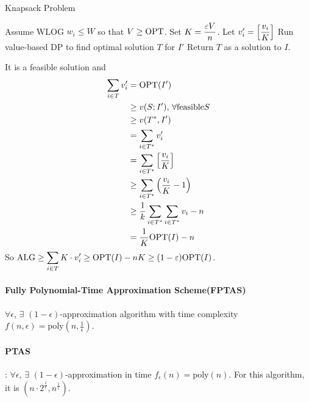 \begin{example}
    \begin{algorithm}
        \caption{Knapsack Problem}
        \begin{algorithmic}[1]
            \STATE Assume WLOG  $ w_i \leq W $ so that  $ V \geq \mathrm{OPT} $.
            \STATE Set  $ K=\displaystyle\frac{\varepsilon V}{n} $. Let  $ v_i'=\left[\displaystyle\frac{v_i}{K}\right] $
            \STATE Run value-based DP to find optimal solution  $ T $ for  $ I' $ 
            \STATE Return  $ T $ as a solution to  $ I $.       
        \end{algorithmic}
    \end{algorithm}
    It is a feasible solution and 
    \begin{align*}
        \sum_{i\in T}v_i'&=\mathrm{OPT}(I')\\
        & \geq v(S;I'),\,\forall \text{feasible} S\\
        & \geq v(T^*,I')\\
        &=\sum_{i\in T^*}v_i'\\
        &=\sum_{i\in T^*}\left[\frac{v_i}{K}\right]\\
        & \geq \sum_{i\in T^*}\left(\frac{v_i}{K}-1\right)\\
        & \geq \frac{1}{k}\sum_{i\in T^*}\sum_{i\in T^*}v_i-n\\
        &=\frac{1}{K}\mathrm{OPT}(I)-n
    \end{align*}
    So  $ \mathrm{ALG} \geq \displaystyle\sum_{i\in T}K\cdot v_i' \geq \mathrm{OPT}(I)-nK \geq (1-\varepsilon)\mathrm{OPT}(I) $. 

    \paragraph{Fully Polynomial-Time Approximation Scheme(FPTAS)}
     $ \forall \epsilon $,  $ \exists  $ $ (1-\epsilon) $-approximation algorithm with time complexity  $ f(n,\epsilon)=\mathrm{poly}(n,\frac{1}{\epsilon}) $.
    
    \paragraph{PTAS}:  $ \forall \epsilon $,  $ \exists $   $ (1-\epsilon) $-approximation in time  $ f_\epsilon(n)=\mathrm{poly}(n) $. For this algorithm, it is   $ (n\cdot 2^{\frac{1}{\epsilon}},n^{\frac{1}{\epsilon}})$.

\end{example}


